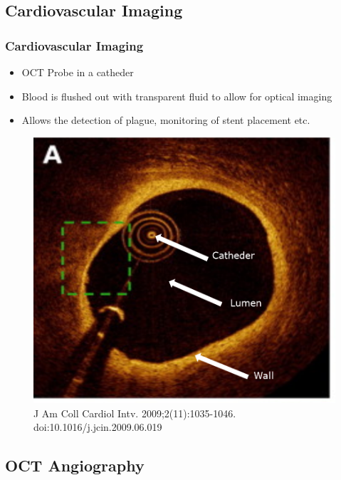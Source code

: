 \subsection{Cardiovascular Imaging}%
\label{sub:cardiovascular_imaging}


\begin{frame}
    \frametitle{Cardiovascular Imaging}
    \begin{itemize}
        \item OCT Probe in a catheder
        \item Blood is flushed out with transparent fluid to allow for optical imaging
        \item Allows the detection of plague, monitoring of stent placement etc.
    \end{itemize}

    \begin{figure}
        \includegraphics[height=0.55\textheight]{figures/Intravascular.png}
        \caption{J Am Coll Cardiol Intv. 2009;2(11):1035-1046. doi:10.1016/j.jcin.2009.06.019
        }
    \end{figure}
\end{frame}

\subsection{OCT Angiography}%
\label{sub:oct_angiography}

